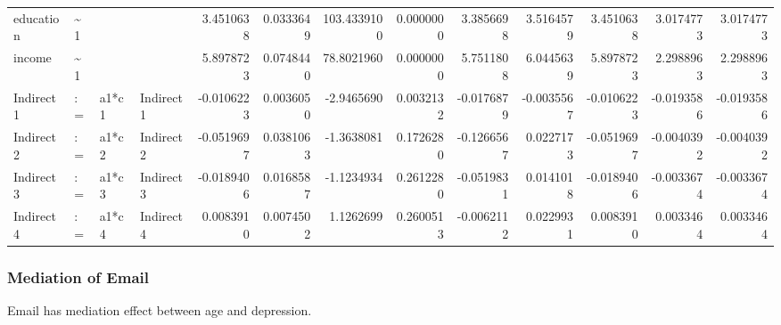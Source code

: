 \documentclass[
]{article}
\begin{document}
\begin{table}[!h]
\begin{tabular}[t]{llllrrrrrrrrr}
\addlinespace
education & \textasciitilde{}1 &  &  & 3.4510638 & 0.0333649 & 103.4339100 & 0.0000000 & 3.3856698 & 3.5164579 & 3.4510638 & 3.0174773 & 3.0174773\\
income & \textasciitilde{}1 &  &  & 5.8978723 & 0.0748440 & 78.8021960 & 0.0000000 & 5.7511808 & 6.0445639 & 5.8978723 & 2.2988963 & 2.2988963\\
Indirect1 & := & a1*c1 & Indirect1 & -0.0106223 & 0.0036050 & -2.9465690 & 0.0032132 & -0.0176879 & -0.0035567 & -0.0106223 & -0.0193586 & -0.0193586\\
Indirect2 & := & a1*c2 & Indirect2 & -0.0519697 & 0.0381063 & -1.3638081 & 0.1726280 & -0.1266567 & 0.0227173 & -0.0519697 & -0.0040392 & -0.0040392\\
Indirect3 & := & a1*c3 & Indirect3 & -0.0189406 & 0.0168587 & -1.1234934 & 0.2612280 & -0.0519831 & 0.0141018 & -0.0189406 & -0.0033674 & -0.0033674\\
\addlinespace
Indirect4 & := & a1*c4 & Indirect4 & 0.0083910 & 0.0074502 & 1.1262699 & 0.2600513 & -0.0062112 & 0.0229931 & 0.0083910 & 0.0033464 & 0.0033464\\
\bottomrule
\end{tabular}
\end{table}

\newpage

\hypertarget{mediation-of-email}{%
\subsubsection{Mediation of Email}\label{mediation-of-email}}

Email has mediation effect between age and depression.
\end{document}
